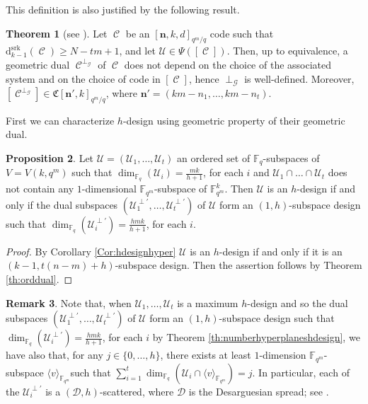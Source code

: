 \documentclass[11pt]{amsart}
\DeclareMathOperator{\C}{\mathcal{C}}
\theoremstyle{definition}
\newtheorem{theorem}{Theorem}[section]
\newtheorem{proposition}[theorem]{Proposition}
\newtheorem{remark}[theorem]{Remark}
\newcommand{\F}{{\mathbb F}}
\newcommand{\U}{{\mathcal{U}}}
\newcommand{\ds}{\mathrm{d}^{\mathrm{srk}}}
\newcommand{\bfn}{\mathbf {n}}
\begin{document}
{This definition is also justified by the following result.

\begin{theorem} [see \textnormal{\cite[Theorem 3.4]{borello2023geometric}}]
Let $\C$ be an $[\bfn,k,d]_{q^m/q}$ code such that $\ds_{k-1}(\C)\geq N-tm+1$, and let $\U \in \Psi([\C])$.
Then, up to equivalence, a geometric dual $\C^{\perp_{\mathcal{G}}}$ of $\C$ does not depend on the choice of the associated system and on the choice of code in $[\C]$, hence $\perp_{\mathcal{G}}$ is well-defined.
Moreover, $[\C^{\perp_{\mathcal{G}}}] \in \mathfrak{C}[\bfn',k]_{q^m/q}$, where $\bfn'=(km-n_1,\ldots,km-n_t)$.
\end{theorem}

First we can characterize $h$-design using geometric property of their geometric dual.

\begin{proposition} \label{prop:geometricdualhdesign}
    Let $\U=(\U_1,\ldots,\U_t)$ an ordered set of $\F_q$-subspaces of $V=V(k,q^m)$ such that $\dim_{\F_q}(\U_i)=\frac{mk}{h+1}$, for each $i$ and $\U_1 \cap \ldots \cap \U_t $ does not contain any $1$-dimensional $\F_{q^m}$-subspace of $\F_{q^m}^k$. Then $\U$ is an $h$-design if and only if the dual subspaces $(\U_1^{\perp'},\ldots,\U_t^{\perp'})$ of $\U$ form an $(1,h)$-subspace design such that $\dim_{\F_q}(\U_i^{\perp'})=\frac{hmk}{h+1}$, for each $i$.
\end{proposition}

\begin{proof}
    By Corollary \ref{Cor:hdesignhyper} $\U$ is an $h$-design if and only if it is an $\left(k-1, t \left(n-m \right)+h\right)$-subspace design. Then the assertion follows by Theorem \ref{th:orddual}.
\end{proof}


\begin{remark} \label{rk:dualstrictlyhdesign}
 Note that, when $\U_1,\ldots,\U_t$ is a maximum $h$-design and so the dual subspaces $(\U_1^{\perp'},\ldots,\U_t^{\perp'})$ of $\U$ form an $(1,h)$-subspace design such that $\dim_{\F_q}(\U_i^{\perp'})=\frac{hmk}{h+1}$, for each $i$ by Theorem \ref{th:numberhyperplaneshdesign}, we have also that, for any $j \in \{0,\ldots,h\}$, there exists at least $1$-dimension $\F_{q^m}$-subspace $\langle v \rangle_{\F_{q^m}} $such that $\sum_{i=1}^t \dim_{\F_q}(\U_i \cap \langle v \rangle_{\F_{q^m}})=j$. In particular, each of the $\U_i^{\perp'}$ is a $(\mathcal{D},h)$-scattered, where $\mathcal{D}$ is the Desarguesian spread; see \cite{gruica2022generalised}.
\end{remark}


}
\end{document}
